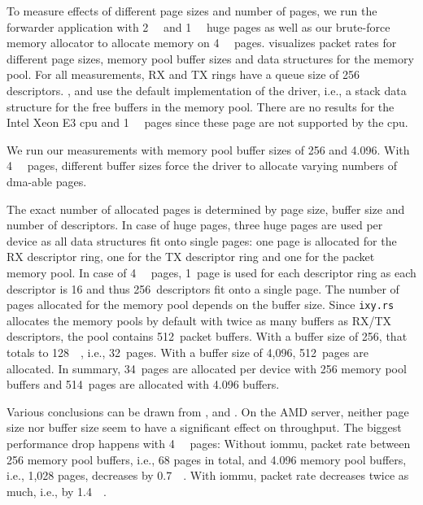 To measure effects of different page sizes and number of pages, we run the
forwarder application with \SI{2}{\mebi\byte} and \SI{1}{\gibi\byte} huge pages
as well as our brute-force memory allocator to allocate memory on
\SI{4}{\kibi\byte} pages.  visualizes packet
rates for different page sizes, memory pool buffer sizes and data structures for
the memory pool. For all measurements, RX and TX rings have a queue size of 256
descriptors. ,
 and  use
the default implementation of the driver, i.e., a stack data structure for the
free buffers in the memory pool. There are no results for the Intel Xeon E3
\ac{cpu} and \SI{1}{\gibi\byte} pages since these page are not supported by the
\ac{cpu}.

We run our measurements with memory pool buffer sizes of \SI{256}{\byte} and
\SI{4,096}{\byte}. With \SI{4}{\kibi\byte} pages, different buffer sizes force
the driver to allocate varying numbers of \ac{dma}-able pages.

The exact number of allocated pages is determined by page size, buffer size and
number of descriptors. In case of huge pages, three huge pages are used per
device as all data structures fit onto single pages: one page is allocated for
the RX descriptor ring, one for the TX descriptor ring and one for the packet
memory pool. In case of \SI{4}{\kibi\byte} pages, 1~page is used for each
descriptor ring as each descriptor is \SI{16}{\byte} and thus 256~descriptors
fit onto a single page. The number of pages allocated for the memory pool
depends on the buffer size. Since \texttt{ixy.rs} allocates the memory pools by
default with twice as many buffers as RX/TX descriptors, the pool contains
512~packet buffers. With a buffer size of \SI{256}{\byte}, that totals to
\SI{128}{\kibi\byte}, i.e., 32~pages. With a buffer size of 4,096, 512~pages are
allocated. In summary, 34~pages are allocated per device with \SI{256}{\byte}
memory pool buffers and 514~pages are allocated with \SI{4,096}{\byte} buffers.

Various conclusions can be drawn from ,
 and . On
the AMD server, neither page size nor buffer size seem to have a significant
effect on throughput. The biggest performance drop happens with
\SI{4}{\kibi\byte} pages: Without \ac{iommu}, packet rate between
\SI{256}{\byte} memory pool buffers, i.e., 68 pages in total, and
\SI{4,096}{\byte} memory pool buffers, i.e., 1,028 pages, decreases by
\SI{0.7}{\mega\pps}. With \ac{iommu}, packet rate decreases twice as much, i.e.,
by \SI{1.4}{\mega\pps}.

